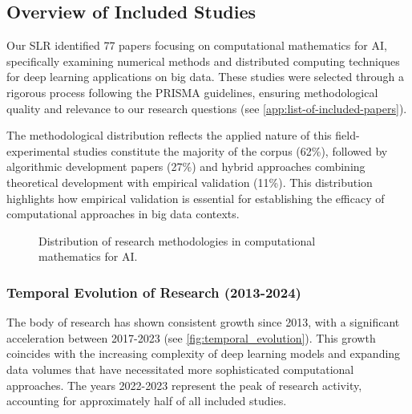 \documentclass[acmsmall]{acmart}
\begin{document}
\subsection{Overview of Included Studies}\label{subsec:overview-of-included-studies}
Our SLR identified 77 papers focusing on computational mathematics for AI, specifically examining numerical methods and distributed computing techniques for deep learning applications on big data. These studies were selected through a rigorous process following the PRISMA guidelines, ensuring methodological quality and relevance to our research questions (see \cref{app:list-of-included-papers}).

The methodological distribution reflects the applied nature of this field-experimental studies constitute the majority of the corpus (62\%), followed by algorithmic development papers (27\%) and hybrid approaches combining theoretical development with empirical validation (11\%). This distribution highlights how empirical validation is essential for establishing the efficacy of computational approaches in big data contexts.

\begin{figure}[ht]
    \centering
    \caption{Distribution of research methodologies in computational mathematics for AI.}
    \label{fig:methodology_distribution}
\end{figure}

\subsubsection{Temporal Evolution of Research (2013-2024)}\label{subsubsec:overview-of-included-studies:temporal-evolution-of-research-2016-2024}
The body of research has shown consistent growth since 2013, with a significant acceleration between 2017-2023 (see \cref{fig:temporal_evolution}). This growth coincides with the increasing complexity of deep learning models and expanding data volumes that have necessitated more sophisticated computational approaches. The years 2022-2023 represent the peak of research activity, accounting for approximately half of all included studies.
\end{document}

